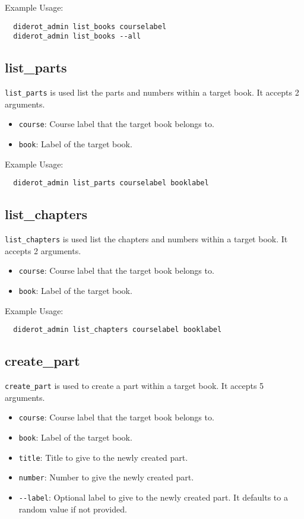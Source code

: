 Example Usage:
\begin{verbatim}
  diderot_admin list_books courselabel
  diderot_admin list_books --all
\end{verbatim}

\subsection{list\_parts}

\verb|list_parts| is used list the parts and numbers within a target book.
It accepts 2 arguments.

\begin{itemize}
  \item \verb|course|: Course label that the target book belongs to.
  \item \verb|book|: Label of the target book.
\end{itemize}

Example Usage:
\begin{verbatim}
  diderot_admin list_parts courselabel booklabel
\end{verbatim}

\subsection{list\_chapters}

\verb|list_chapters| is used list the chapters and numbers within a target book.
It accepts 2 arguments.

\begin{itemize}
  \item \verb|course|: Course label that the target book belongs to.
  \item \verb|book|: Label of the target book.
\end{itemize}

Example Usage:
\begin{verbatim}
  diderot_admin list_chapters courselabel booklabel
\end{verbatim}

\subsection{create\_part}

\verb|create_part| is used to create a part within a target book. It accepts 5 arguments.

\begin{itemize}
  \item \verb|course|: Course label that the target book belongs to.
  \item \verb|book|: Label of the target book.
  \item \verb|title|: Title to give to the newly created part.
  \item \verb|number|: Number to give the newly created part.
  \item \verb|--label|: Optional label to give to the newly created part. It defaults to a random value if not provided.
\end{itemize}

